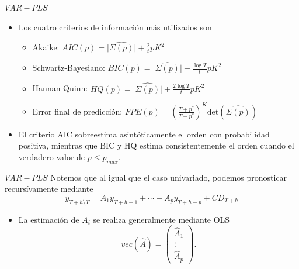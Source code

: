 \documentclass{beamer}
\newcommand{\?}{?`}
\begin{document}
\begin{frame}{$VAR-PLS$}
  \begin{itemize}
  \item Los cuatro criterios de informaci\'on m\'as utilizados son
    \begin{itemize}
    \item Akaike: $AIC(p)=\vert \hat{\Sigma(p)} \vert +
      \frac{2}{t}pK^2$
    \item Schwartz-Bayesiano: $BIC(p)=\vert \hat{\Sigma(p)} \vert +
      \frac{\log T}{t}pK^2$
    \item Hannan-Quinn: $HQ(p)=\vert \hat{\Sigma(p)} \vert +
      \frac{2\log T}{t}pK^2$
    \item Error final de predicci\'on:
      $FPE(p)=\left(\frac{T+p^{*}}{T-p^{*}}\right)^K
      \text{det}(\hat{\Sigma(p)})$  
    \end{itemize}
  \item El criterio AIC sobreestima asint\'oticamente el orden con
    probabilidad positiva, mientras que BIC y HQ estima
    consistentemente el orden cuando el verdadero valor de $p\leq
    p_{max}$. 
  \end{itemize}
\end{frame}

\begin{frame}{$VAR-PLS$}
  Notemos que al igual que el caso univariado, podemos pronosticar
  recurs\'ivamente mediante
  \begin{displaymath}
    y_{T+h\setminus T}=A_1y_{T+h-1} + \cdots + A_py_{T+h-p} + CD_{T+h}
  \end{displaymath}
  \begin{itemize}
  \item La estimaci\'on de $A_i$ se realiza generalmente mediante OLS
    \begin{displaymath}
        vec(\hat{A})=\left(
        \begin{array}{c}
          \hat{A}_1 \\
          \vdots \\
          \hat{A}_p
        \end{array}
        \right).      
    \end{displaymath}
  \end{itemize}
\end{frame}
\end{document}
